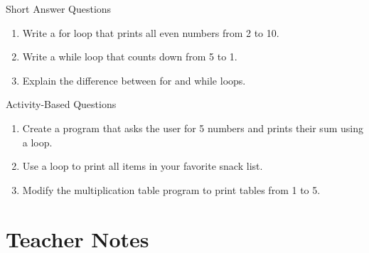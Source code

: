 \begin{exercise}{Short Answer Questions}
\begin{enumerate}
    \item Write a for loop that prints all even numbers from 2 to 10.  
    \item Write a while loop that counts down from 5 to 1.  
    \item Explain the difference between for and while loops.  
\end{enumerate}
\end{exercise}

\begin{exercise}{Activity-Based Questions}
\begin{enumerate}
    \item Create a program that asks the user for 5 numbers and prints their sum using a loop.  
    \item Use a loop to print all items in your favorite snack list.  
    \item Modify the multiplication table program to print tables from 1 to 5.  
\end{enumerate}
\end{exercise}

\section{Teacher Notes}

